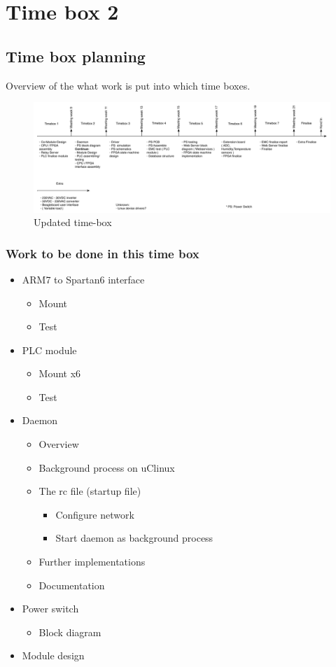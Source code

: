 \section{Time box 2}
\subsection{Time box planning}
Overview of the what work is put into which time boxes.
\begin{figure}[H]
	\begin{centering}
		 \includegraphics[width=1.0\textwidth]{images/tb_r2.pdf}
		\caption{Updated time-box}
	\end{centering}
\end{figure}

\subsubsection{Work to be done in this time box}
\begin{itemize}
	\item ARM7 to Spartan6 interface
	\begin{itemize}
		\item Mount
		\item Test
	\end{itemize}
	\item PLC module
	\begin{itemize}
		\item Mount x6
		\item Test
	\end{itemize}
	\item Daemon
	\begin{itemize}
		\item Overview
		\item Background process on uClinux
		\item The rc file (startup file)
		\begin{itemize}
			\item Configure network
			\item Start daemon as background process
		\end{itemize}
		\item Further implementations
		\item Documentation
	\end{itemize}
	\item Power switch
	\begin{itemize}
		\item Block diagram
	\end{itemize}
	\item Module design
\end{itemize}
